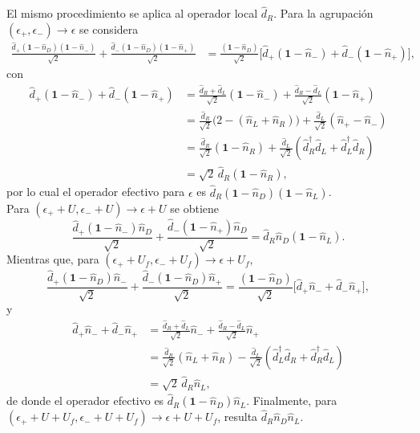 \begin{appendixs}
El mismo procedimiento se aplica al operador local \(\hat{d}_{R}\). Para la agrupación \((\epsilon_{+},\epsilon_{-})\to \epsilon\) se considera
\begin{align*}
\frac{\hat{d}_{+}(\mathbf{1}-\hat{n}_{D})(\mathbf{1}-\hat{n}_{-})}{\sqrt{2}}
+\frac{\hat{d}_{-}(\mathbf{1}-\hat{n}_{D})(\mathbf{1}-\hat{n}_{+})}{\sqrt{2}}
&=\frac{(\mathbf{1}-\hat{n}_{D})}{\sqrt{2}}\big[\hat{d}_{+}(\mathbf{1}-\hat{n}_{-})
+\hat{d}_{-}(\mathbf{1}-\hat{n}_{+})\big],
\end{align*}
con
\begin{align*}
\hat{d}_{+}(\mathbf{1}-\hat{n}_{-})+\hat{d}_{-}(\mathbf{1}-\hat{n}_{+})
&=\frac{\hat{d}_{R}+\hat{d}_{L}}{\sqrt{2}}(\mathbf{1}-\hat{n}_{-})
+\frac{\hat{d}_{R}-\hat{d}_{L}}{\sqrt{2}}(\mathbf{1}-\hat{n}_{+})\\
&=\frac{\hat{d}_{R}}{\sqrt{2}}\big(2-(\hat{n}_{L}+\hat{n}_{R})\big)
+\frac{\hat{d}_{L}}{\sqrt{2}}(\hat{n}_{+}-\hat{n}_{-})\\
&=\frac{\hat{d}_{R}}{\sqrt{2}}(\mathbf{1}-\hat{n}_{R})
+\frac{\hat{d}_{L}}{\sqrt{2}}(\hat{d}^{\dagger}_{R}\hat{d}_{L}+\hat{d}^{\dagger}_{L}\hat{d}_{R})\\
&=\sqrt{2}\,\hat{d}_{R}(\mathbf{1}-\hat{n}_{R}),
\end{align*}
por lo cual el operador efectivo para \(\epsilon\) es
\(\hat{d}_{R}(\mathbf{1}-\hat{n}_{D})(\mathbf{1}-\hat{n}_{L})\).
\\

Para \((\epsilon_{+}+U,\epsilon_{-}+U)\to \epsilon+U\) se obtiene
\[
\frac{\hat{d}_{+}(\mathbf{1}-\hat{n}_{-})\hat{n}_{D}}{\sqrt{2}}
+\frac{\hat{d}_{-}(\mathbf{1}-\hat{n}_{+})\hat{n}_{D}}{\sqrt{2}}
=\hat{d}_{R}\hat{n}_{D}(\mathbf{1}-\hat{n}_{L}).
\]
Mientras que, para \((\epsilon_{+}+U_{f},\epsilon_{-}+U_{f})\to \epsilon+U_{f}\),
\[
\frac{\hat{d}_{+}(\mathbf{1}-\hat{n}_{D})\hat{n}_{-}}{\sqrt{2}}
+\frac{\hat{d}_{-}(\mathbf{1}-\hat{n}_{D})\hat{n}_{+}}{\sqrt{2}}
=\frac{(\mathbf{1}-\hat{n}_{D})}{\sqrt{2}}\big[\hat{d}_{+}\hat{n}_{-}+\hat{d}_{-}\hat{n}_{+}\big],
\]
y
\begin{align*}
\hat{d}_{+}\hat{n}_{-}+\hat{d}_{-}\hat{n}_{+}
&=\frac{\hat{d}_{R}+\hat{d}_{L}}{\sqrt{2}}\hat{n}_{-}
+\frac{\hat{d}_{R}-\hat{d}_{L}}{\sqrt{2}}\hat{n}_{+}\\
&=\frac{\hat{d}_{R}}{\sqrt{2}}(\hat{n}_{L}+\hat{n}_{R})
-\frac{\hat{d}_{L}}{\sqrt{2}}(\hat{d}^{\dagger}_{L}\hat{d}_{R}+\hat{d}^{\dagger}_{R}\hat{d}_{L})\\
&=\sqrt{2}\,\hat{d}_{R}\hat{n}_{L},
\end{align*}
de donde el operador efectivo es \(\hat{d}_{R}(\mathbf{1}-\hat{n}_{D})\hat{n}_{L}\). Finalmente, para
\((\epsilon_{+}+U+U_{f},\epsilon_{-}+U+U_{f})\to \epsilon+U+U_{f}\), resulta
\(\hat{d}_{R}\hat{n}_{D}\hat{n}_{L}\).
\\


\end{appendixs}
